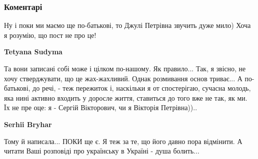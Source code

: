  
 
 
 
 
\subsubsection{Коментарі}

\begin{itemize}
 
Ну і поки ми маємо ще по-батькові, то Джулі Петрівна звучить дуже мило) Хоча я розумію, що пост не про це!

\begin{itemize}
 
\textbf{Tetyana Sudyma} 

Та вони записані собі може і цілком по-нашому. Як
правило... Так, я звісно, не хочу стверджувати, що це жах-жахливий. Однак
розмивання основ триває... А по-батькові, до речі, - теж пережиток і, наскільки
я от спостерігаю, сучасна молодь, яка нині активно входить у доросле життя,
ставиться до того вже не так, як ми. Їх не пре оце: я - Сергій Вікторович, чи я
Вікторія Петрівна))..

 
\textbf{Serhii Bryhar} 

Тому й написала... ПОКИ ще є. Я теж за те, що його давно
пора відмінити. А читати Ваші розповіді про українську в Україні - душа
болить...

 

\end{itemize}
\end{itemize}
